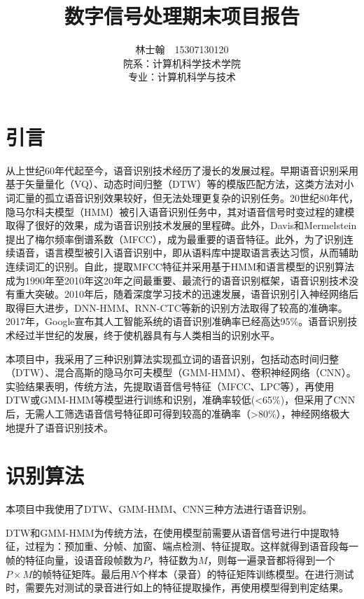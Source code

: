 \documentclass[UTF8]{article}
\title{\bfseries 数字信号处理期末项目报告}
\author{林士翰~~15307130120\\院系：计算机科学技术学院\\专业：计算机科学与技术}
\begin{document}
\begin{titlepage}
	\maketitle
	\tableofcontents
	\thispagestyle{empty}
\end{titlepage}

\section{引言}
从上世纪60年代起至今，语音识别技术经历了漫长的发展过程。早期语音识别采用基于矢量量化（VQ）、动态时间归整（DTW）等的模版匹配方法，这类方法对小词汇量的孤立语音识别效果较好，但无法处理更复杂的识别任务\cite{lizhao2016speech}。20世纪80年代，隐马尔科夫模型（HMM）被引入语音识别任务中，其对语音信号时变过程的建模取得了很好的效果，成为语音识别技术发展的里程碑\cite{rabiner1989tutorial}。此外，Davis和Mermelstein提出了梅尔频率倒谱系数（MFCC），成为最重要的语音特征\cite{davis1980comparison}。此外，为了识别连续语音，语言模型被引入语音识别中，即从语料库中提取语言表达习惯，从而辅助连续词汇的识别。自此，提取MFCC特征并采用基于HMM和语言模型的识别算法成为1990年至2010年这20年之间最重要、最流行的语音识别框架，语音识别技术没有重大突破\cite{yunwang2018history}。2010年后，随着深度学习技术的迅速发展，语音识别引入神经网络后取得巨大进步，DNN-HMM、RNN-CTC等新的识别方法取得了较高的准确率。2017年，Google宣布其人工智能系统的语音识别准确率已经高达95\%\cite{fortune2017google}。语音识别技术经过半世纪的发展，终于使机器具有与人类相当的识别水平。

本项目中，我采用了三种识别算法实现孤立词的语音识别，包括动态时间归整（DTW）、混合高斯的隐马尔可夫模型（GMM-HMM）、卷积神经网络（CNN）。实验结果表明，传统方法，先提取语音信号特征（MFCC、LPC等），再使用DTW或GMM-HMM等模型进行训练和识别，准确率较低(<65\%)，但采用了CNN后，无需人工筛选语音信号特征即可得到较高的准确率（>80\%），神经网络极大地提升了语音识别技术。

\section{识别算法}
本项目中我使用了DTW、GMM-HMM、CNN三种方法进行语音识别。

DTW和GMM-HMM为传统方法，在使用模型前需要从语音信号进行中提取特征，过程为：预加重、分帧、加窗、端点检测、特征提取。这样就得到语音段每一帧的特征向量，设语音段帧数为$P$，特征数为$M$，则每一遍录音都将得到一个$P \times M$的帧特征矩阵。最后用$N$个样本（录音）的特征矩阵训练模型。在进行测试时，需要先对测试的录音进行如上的特征提取操作，再使用模型得到判定结果。
\end{document}

